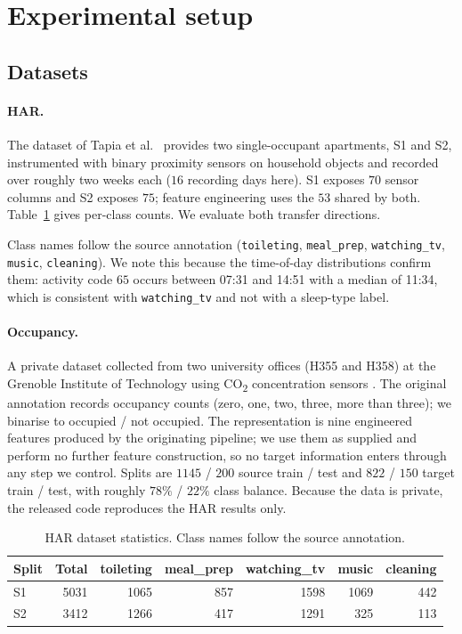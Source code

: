 \documentclass[a4paper,fleqn]{cas-dc}
\begin{document}
\section{Experimental setup}
\label{sec:setup}

\subsection{Datasets}

\paragraph{HAR.} The dataset of Tapia et al.~\cite{tapia2004} provides two single-occupant
apartments, S1 and S2, instrumented with binary proximity sensors on household objects and
recorded over roughly two weeks each ($16$ recording days here). S1 exposes $70$ sensor columns and S2 exposes $75$; feature engineering uses the
$53$ shared by both. Table~\ref{tab:har-data} gives per-class counts. We evaluate both
transfer directions.

Class names follow the source annotation (\texttt{toileting}, \texttt{meal\_prep},
\texttt{watching\_tv}, \texttt{music}, \texttt{cleaning}). We note this because the
time-of-day distributions confirm them: activity code $65$ occurs between 07:31 and 14:51
with a median of 11:34, which is consistent with \texttt{watching\_tv} and not with a
sleep-type label.

\paragraph{Occupancy.} A private dataset collected from two university offices (H355 and
H358) at the Grenoble Institute of Technology using CO\textsubscript{2} concentration
sensors \cite{dridi_cluster,amayri2019}. The original annotation records occupancy counts
(zero, one, two, three, more than three); we binarise to occupied / not occupied. The
representation is nine engineered features produced by the originating pipeline; we use
them as supplied and perform no further feature construction, so no target information
enters through any step we control. Splits are $1145$ / $200$ source train / test and
$822$ / $150$ target train / test, with roughly $78\%$ / $22\%$ class balance. Because
the data is private, the released code reproduces the HAR results only.

\begin{table}[t]
\centering
\caption{HAR dataset statistics. Class names follow the source annotation.}
\label{tab:har-data}
\small
\begin{tabular}{lrrrrrr}
\toprule
Split & Total & toileting & meal\_prep & watching\_tv & music & cleaning \\
\midrule
S1 & 5031 & 1065 & 857 & 1598 & 1069 & 442 \\
S2 & 3412 & 1266 & 417 & 1291 & 325 & 113 \\
\bottomrule
\end{tabular}
\end{table}
\end{document}

